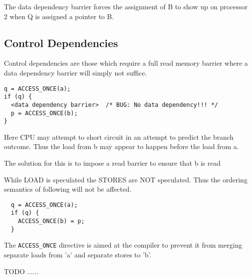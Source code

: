 \documentclass{article}
\begin{document}
The data dependency barrier forces the assignment of B to show up on
processor 2 when Q is assigned a pointer to B.


\subsection{Control Dependencies}

Control dependencies are those which require a full read memory
barrier where a data dependency barrier will simply not suffice.

\begin{lstlisting}
q = ACCESS_ONCE(a);
if (q) {
  <data dependency barrier>  /* BUG: No data dependency!!! */
  p = ACCESS_ONCE(b);
}
\end{lstlisting}

Here CPU may attempt to short circuit in an attempt to predict the
branch outcome. Thus the load from b may appear to happen before the
load from a.

The solution for this is to impose a read barrier to ensure that b is
read


While LOAD is speculated the STORES are NOT speculated. Thus the
ordering semantics of following will not be affected.

\begin{lstlisting}
  q = ACCESS_ONCE(a);
  if (q) {
    ACCESS_ONCE(b) = p;
  }  
\end{lstlisting}


The \lstinline{ACCESS_ONCE} directive is aimed at the compiler to
prevent it from merging separate loads from 'a' and separate stores to
'b'.

TODO ......

\end{document}
